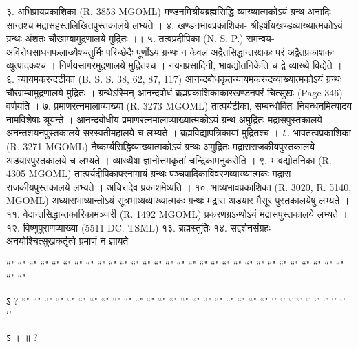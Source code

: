 ३. अभिप्रायप्रकाशिका (R. 3853 MGOML)
मण्डनमिश्रीयब्रह्मसिद्धि व्याख्यात्मकोऽयं ग्रन्थ अनादिः सान्तश्च मद्रासहस्तलिखितपुस्तकालये लभ्यते ।
४. खण्डनभावप्रकाशिका-
श्रीहर्षीयखण्डव्याख्यात्मकोऽयं ग्रन्थः अंशतः चौखाम्बामुद्रणालये मुद्रितः ।।
५. तत्वप्रदीपिका (N. S. P.)
समन्वय-अविरोधसाधनफलाख्यैश्चतुर्भिः परिच्छेदैः पूर्णोऽयं ग्रन्थः न केवलं अद्वैतसिद्धान्तरक्षकः परं अद्वैतप्रकाशकः व्युत्पादकश्च । निर्णयसागरमुद्रणालये मुद्रितश्च । नयनप्रसादिनी, भावद्योतनिकेति च द्वे व्याख्ये विद्येते ।
६. न्यायमकरन्दटीका (B. S. S. 38, 62, 87, 117)
आनन्दबोधकृतन्यायमकरन्दव्याख्यात्मकोऽयं ग्रन्थः चौखाम्बामुद्रणालये मुद्रितः । ग्रन्थेऽस्मिन् आनन्दवोधं ब्रह्मप्रकाशिकाकारखण्डनपरं चित्सुखः (Page 346) वर्णयति ।
७. प्रमाणरत्नमालाव्याख्या (R. 3273 MGOML)
तात्पर्यटीका, सम्बन्धोक्तिः निबन्धनमित्यादय नामविशेषाः श्रूयन्ते । आनन्दबोधीय प्रमाणरत्नमालाव्याख्यात्मकोऽयं ग्रन्थ अमुद्रितः मद्रासपुस्तकालये अनन्तशयनपुस्तकालये सरस्वतीमहालये च लभ्यते । ब्रह्मविद्यापत्रिकायां मुद्रितश्च ।
८. भावतत्वप्रकाशिका (R. 3271 MGOML)
नैष्कर्म्यसिद्धिव्याख्यात्मकोऽयं ग्रन्थः अमुद्रितः मद्रासराजकीयपुस्तकालये अडयारपुस्तकालये च लभ्यते । व्याख्यैषा ज्ञानोत्तमकृतां चन्द्रिकामनुकरोति ।
९. भावद्योतनिका (R. 4305 MGOML)
तात्पर्यदीपिकापरनामायं ग्रन्थः पञ्चपादिकाविवरणव्याख्यात्मकः मद्रास राजकीयपुस्तकालये लभ्यते । अचिरादेव प्रकाशमेष्यति ।
१०. भाष्यभावप्रकाशिका (R. 3020, R. 5140, MGOML)
अध्यासभाष्यान्तोऽयं सूत्रभाष्यव्याख्यात्मकः ग्रन्थः मद्रास अडयार मैसूर पुस्तकालयेषु लभ्यते ।
११. वेदान्तसिद्धान्तकारिकामञ्जरी (R. 1492 MGOML) प्रकरणग्रऽन्थोऽयं मद्रासपुस्तकालये लभ्यते ।
१२. विष्णुपुराणव्याख्या (5511 DC. TSML)
१३. ब्रह्मस्तुतिः
१४. सद्दर्शनसंग्रहः --- अनयोश्चित्सुखकर्तृत्वे प्रमाणं न ज्ञायते ।



 ``" ``" ``" ``" ``" ``" ``" ``" ``" ``" ``" ``" ``" ``" ``" ``" ``" ``" ``" ``" ``" ``" ``" ``" ``" ``" ``" ``" ``" ``" ``" ``" 

ऽ  ?
``" ``" ``" ``" ``" ``" ``" ``" ``" ``" ``" ``" ``" ``" ``" ``" ``" ``" ``" ``" ``" ``"
`' `' `' `' `' `' `' `' `' `' 

ऽ  ।   ॥ ?
